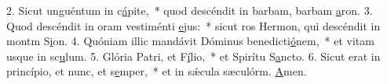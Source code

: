 2. Sicut unguéntum in c\uline{á}pite,~* quod descéndit in barbam, barbam \uline{a}ron.
3. Quod descéndit in oram vestiménti \uline{e}jus:~* sicut ros Hermon, qui descéndit in montm S\uline{i}on.
4. Quóniam illic mandávit Dóminus benedicti\uline{ó}nem,~* et vitam usque in sc\uline{u}lum.
5. Glória Patri, et F\uline{í}lio,~* et Spirítu S\uline{a}ncto.
6. Sicut erat in princípio, et nunc, et s\uline{e}mper,~* et in sǽcula sæculórm. \uline{A}men.
